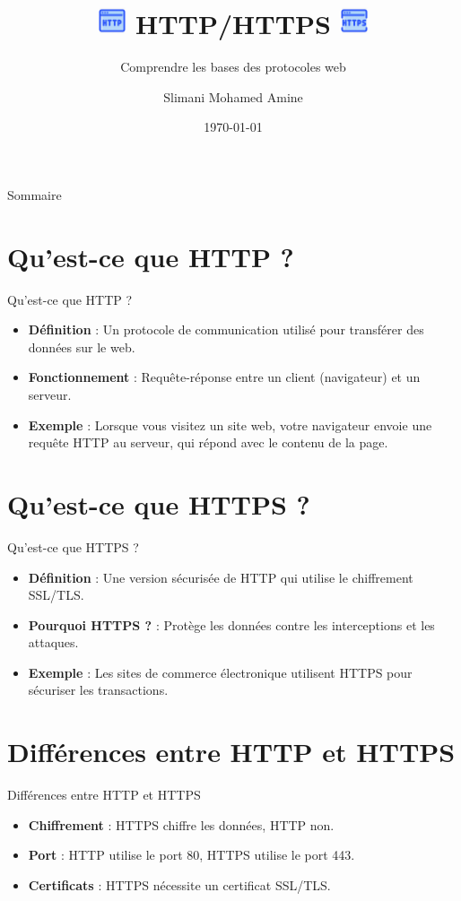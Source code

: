 \documentclass{clbeamer2024}
\title{
	\includegraphics[width=0.8cm]{logos/Http.png} \hfill
	HTTP/HTTPS \hfill
	\includegraphics[width=0.8cm]{logos/https.png}
}
\subtitle{Comprendre les bases des protocoles web}
\author{Slimani Mohamed Amine}
\institute{}
\date{\today}
\begin{document}
	\setcounter{framenumber}{-1}
	\frame{\titlepage}
	
	
	
	\begin{frame}{Sommaire}
		\tableofcontents
	\end{frame}
	

\section{Qu'est-ce que HTTP ?}
\begin{frame}{Qu'est-ce que HTTP ?}
	\begin{itemize}
		\item \textbf{Définition} : Un protocole de communication utilisé pour transférer des données sur le web.
		\item \textbf{Fonctionnement} : Requête-réponse entre un client (navigateur) et un serveur.
		\item \textbf{Exemple} : Lorsque vous visitez un site web, votre navigateur envoie une requête HTTP au serveur, qui répond avec le contenu de la page.
	\end{itemize}
\end{frame}

\section{Qu'est-ce que HTTPS ?}
\begin{frame}{Qu'est-ce que HTTPS ?}
	\begin{itemize}
		\item \textbf{Définition} : Une version sécurisée de HTTP qui utilise le chiffrement SSL/TLS.
		\item \textbf{Pourquoi HTTPS ?} : Protège les données contre les interceptions et les attaques.
		\item \textbf{Exemple} : Les sites de commerce électronique utilisent HTTPS pour sécuriser les transactions.
	\end{itemize}
\end{frame}

\section{Différences entre HTTP et HTTPS}
\begin{frame}{Différences entre HTTP et HTTPS}
	\begin{itemize}
		\item \textbf{Chiffrement} : HTTPS chiffre les données, HTTP non.
		\item \textbf{Port} : HTTP utilise le port 80, HTTPS utilise le port 443.
		\item \textbf{Certificats} : HTTPS nécessite un certificat SSL/TLS.
	\end{itemize}
\end{frame}
\end{document}
